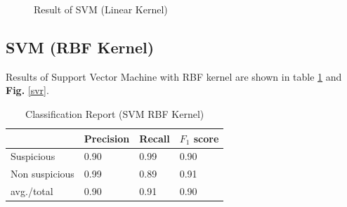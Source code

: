 \begin{figure}[H]
\centering
{}%
\hfill %
%
\caption{Result of SVM (Linear Kernel)}
\label{slk}
\end{figure}

\subsection{\textbf{SVM (RBF Kernel)}}
Results of Support Vector Machine with RBF kernel are shown in table \ref{SVMR} and \textbf{Fig.} \ref{svr}.
\renewcommand{\arraystretch}{1.1}
\begin{table}[h!]
\begin{center}
\caption{Classification Report (SVM RBF Kernel)}
\begin{tabular}{|m{2.8cm} | m{1.5cm}| m{1.3cm}| m{1.5cm}|}
\hline
     & Precision & Recall & $F_1$ score\\
\hline
     Suspicious & 0.90 & 0.99 & 0.90\\
\hline 
     Non suspicious  & 0.99 & 0.89 & 0.91\\
\hline 
     avg./total & 0.90 & 0.91 & 0.90\\
\hline
\end{tabular}
\label{SVMR}
\end{center}
\end{table}

